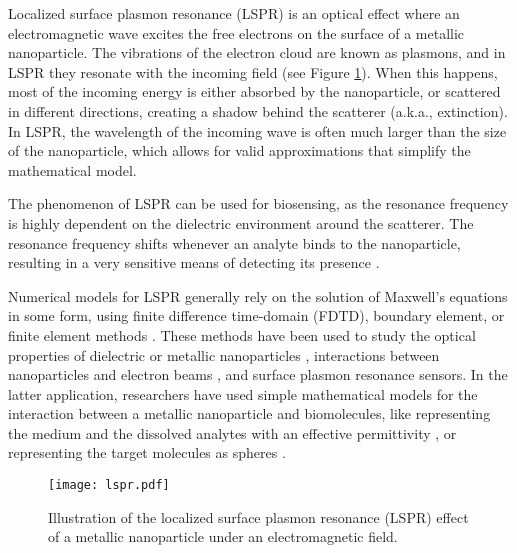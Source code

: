 
Localized surface plasmon resonance (LSPR) is an optical effect where an 
electromagnetic wave excites the free electrons on the surface of a metallic nanoparticle.
The vibrations of the electron cloud are known as plasmons, and in LSPR they resonate with the incoming
field (see Figure \ref{fig:lspr}). When this happens, most of the incoming energy
is either absorbed by the nanoparticle, or scattered in different directions,
creating a shadow behind the scatterer (a.k.a., extinction). In LSPR,
the wavelength of the incoming wave is often much larger than 
the size of the nanoparticle, 
which allows for valid approximations that simplify the mathematical model.

The phenomenon of LSPR can be used for biosensing, 
as the resonance frequency is highly dependent on the dielectric environment 
around the scatterer. 
The resonance frequency shifts whenever an analyte binds to the nanoparticle, 
resulting in a very sensitive means of detecting its presence \cite{HaesVanduyne2002,HaesETal2004}.

Numerical models for LSPR generally rely on the 
solution of Maxwell's equations in some form, using finite difference time-domain (FDTD),
boundary element, or finite element methods \cite{SolisTaboadaObelleiroLiz-MaarzanGarciadeabajo2014}. 
These methods have been used to study the 
optical properties of dielectric or metallic nanoparticles \cite{Hohenester2018,HohenesterTrugler2012,
JungPedersenSondergaardPedersenLarsenNielsen2010, VideenSun2003,
MayergoyzFredkinZhang2005, MayergoyzZhang2007}, interactions between nanoparticles
and electron beams \cite{GarciadeabajoAizpurua1997, GarciadeabajoHowie2002},
and surface plasmon resonance sensors.
In the latter application, researchers have used simple mathematical models for the 
interaction between a metallic nanoparticle and biomolecules,
like representing the medium and the dissolved analytes with an effective permittivity \cite{JungCampbellChinowskyMarYee1998,WilletsVandyune2007,PhanETal2013}, 
or representing the target molecules as spheres 
\cite{DavisGomezVernon2010,AntosiewiczApellClaudioKall2011}.


\begin{figure}
 \centering
   \texttt{[image: lspr.pdf]} 
   \caption{Illustration of the localized surface plasmon resonance (LSPR) effect of a metallic nanoparticle under an electromagnetic field.    \label{fig:lspr}}
  \end{figure}

